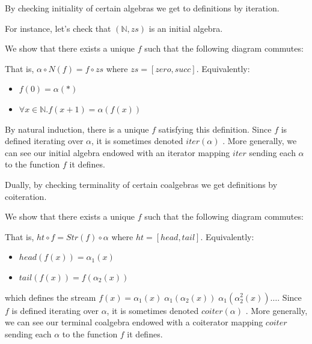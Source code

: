 \begin{example}
	By checking initiality of certain algebras we get to definitions by iteration. 
	
	For instance, let's check that $(\mathbb{N},zs)$ is an initial algebra.
	
	We show that there exists a unique $f$ such that the following diagram commutes:
	
	
	That is, $\alpha \circ N(f) = f \circ zs$ where $zs = [zero,succ]$. Equivalently:
	
	\begin{itemize}
		\item $f(0) = \alpha(*)$
		\item $\forall x \in \mathbb{N}. f(x+1) = \alpha(f(x))$ 	
	\end{itemize}

	By natural induction, there is a unique $f$ satisfying this definition.	Since $f$ is defined iterating over $\alpha$, it is sometimes denoted $iter(\alpha)$ \cite{geuvers2007iteration}. More generally, we can see our initial algebra endowed with an iterator mapping $iter$ sending each $\alpha$ to the function $f$ it defines. 
	
	Dually, by checking terminality of certain coalgebras we get definitions by coiteration.
	
	We show that there exists a unique $f$ such that the following diagram commutes:
	

	That is, $ht \circ f = Str(f) \circ \alpha$ where $ht = [head,tail]$. Equivalently:
	
	\begin{itemize}
	\item $head(f(x)) = \alpha_1(x)$
	\item $tail(f(x)) = f(\alpha_2(x))$ 	
	\end{itemize}

	which defines the stream $f(x) = \alpha_1(x) \; \alpha_1(\alpha_2(x)) \; \alpha_1(\alpha_2^ 2 (x)) \ldots$. Since $f$ is defined iterating over $\alpha$, it is sometimes denoted $coiter(\alpha)$ \cite{geuvers2007iteration}. More generally, we can see our terminal coalgebra endowed with a coiterator mapping $coiter$ sending each $\alpha$ to the function $f$ it defines. 		
\end{example}

